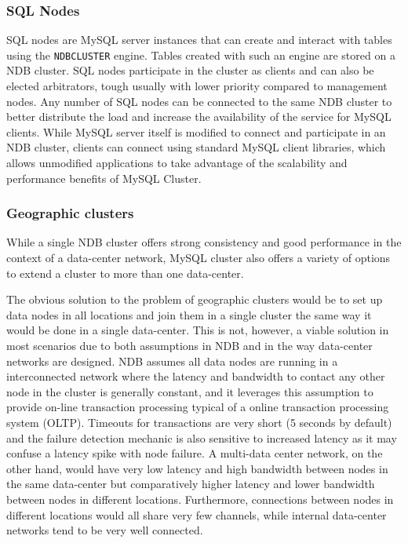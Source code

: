 \subsubsection{SQL Nodes}
SQL nodes are MySQL server instances that can create and interact with tables using the \texttt{NDBCLUSTER} engine.
Tables created with such an engine are stored on a NDB cluster.
SQL nodes participate in the cluster as clients and can also be elected arbitrators, tough usually with lower priority compared to management nodes.
Any number of SQL nodes can be connected to the same NDB cluster to better distribute the load and increase the availability of the service for MySQL clients.
While MySQL server itself is modified to connect and participate in an NDB cluster, clients can connect using standard MySQL client libraries, which allows unmodified applications to take advantage of the scalability and performance benefits of MySQL Cluster.


\subsubsection{Geographic clusters}
While a single NDB cluster offers strong consistency and good performance in the context of a data-center network, MySQL cluster also offers a variety of options to extend a cluster to more than one data-center.

The obvious solution to the problem of geographic clusters would be to set up data nodes in all locations and join them in a single cluster the same way it would be done in a single data-center.
This is not, however, a viable solution in most scenarios due to both assumptions in NDB and in the way data-center networks are designed.
NDB assumes all data nodes are running in a interconnected network where the latency and bandwidth to contact any other node in the cluster is generally constant, and it leverages this assumption to provide on-line transaction processing typical of a online transaction processing system (OLTP).
Timeouts for transactions are very short (5 seconds by default) and the failure detection mechanic is also sensitive to increased latency as it may confuse a latency spike with node failure.
A multi-data center network, on the other hand, would have very low latency and high bandwidth between nodes in the same data-center but comparatively higher latency and lower bandwidth between nodes in different locations.
Furthermore, connections between nodes in different locations would all share very few channels, while internal data-center networks tend to be very well connected.

